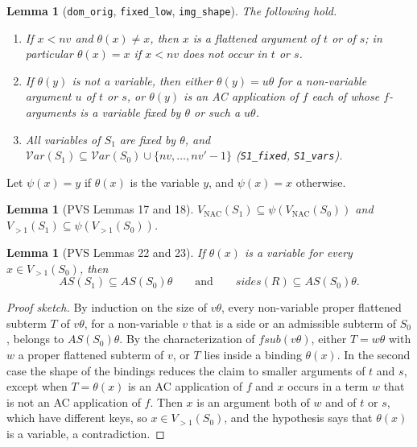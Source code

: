 \documentclass[11pt,a4paper]{article}
\newtheorem{lemma}[theorem]{Lemma}
\theoremstyle{definition}
\theoremstyle{remark}
\newcommand{\isa}[1]{\mbox{\small\texttt{#1}}}
\newcommand{\vars}{\mathcal{V}\mathit{ar}}
\newcommand{\fsub}{\mathit{fsub}}
\newcommand{\VNAC}{V_{\mathrm{NAC}}}
\newcommand{\Vtwo}{V_{>1}}
\newcommand{\AS}{\mathit{AS}}
\newcommand{\sides}{\mathit{sides}}
\begin{document}
\begin{lemma}[\isa{dom\_orig}, \isa{fixed\_low}, \isa{img\_shape}]\label{lem:theta}
  The following hold.
  \begin{enumerate}[nosep]
    \item If $x < \mathit{nv}$ and $\theta(x) \neq x$, then $x$ is a flattened argument of $t$
          or of $s$; in particular $\theta(x) = x$ if $x < \mathit{nv}$ does not occur in $t$ or $s$.
    \item If $\theta(y)$ is not a variable, then either $\theta(y) = u\theta$ for a non-variable
          argument $u$ of $t$ or $s$, or $\theta(y)$ is an AC application of $f$ each of whose
          $f$-arguments is a variable fixed by $\theta$ or such a $u\theta$.
    \item All variables of $S_1$ are fixed by $\theta$, and
          $\vars(S_1) \subseteq \vars(S_0) \cup \{\mathit{nv}, \dots, \mathit{nv}'-1\}$
          (\isa{S1\_fixed}, \isa{S1\_vars}).
  \end{enumerate}
\end{lemma}

Let $\psi(x) = y$ if $\theta(x)$ is the variable $y$, and $\psi(x) = x$ otherwise.

\begin{lemma}[PVS Lemmas 17 and 18]
  $\VNAC(S_1) \subseteq \psi(\VNAC(S_0))$ and $\Vtwo(S_1) \subseteq \psi(\Vtwo(S_0))$.
\end{lemma}

\begin{lemma}[PVS Lemmas 22 and 23]\label{lem:as-step}
  If $\theta(x)$ is a variable for every $x \in \Vtwo(S_0)$, then
  \[
    \AS(S_1) \subseteq \AS(S_0)\theta \qquad\text{and}\qquad \sides(R) \subseteq \AS(S_0)\theta.
  \]
\end{lemma}

\begin{proof}[Proof sketch]
  By induction on the size of $v\theta$, every non-variable proper flattened subterm $T$ of
  $v\theta$, for a non-variable $v$ that is a side or an admissible subterm of $S_0$, belongs to
  $\AS(S_0)\theta$. By the characterization of $\fsub(v\theta)$, either $T = w\theta$ with
  $w$ a proper flattened subterm of $v$, or $T$ lies inside a binding $\theta(x)$. In the second
  case the shape of the bindings reduces the claim to smaller arguments of $t$ and $s$, except
  when $T = \theta(x)$ is an AC application of $f$ and $x$ occurs in a term $w$ that is not an AC
  application of $f$. Then $x$ is an argument both of $w$ and of $t$ or $s$, which have different
  keys, so $x\in\Vtwo(S_0)$, and the hypothesis says that $\theta(x)$ is a variable, a
  contradiction.
\end{proof}
\end{document}
